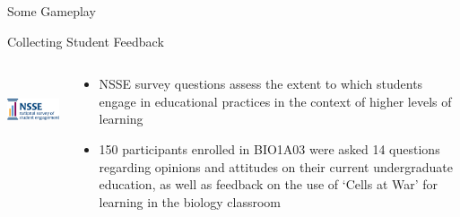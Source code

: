 \documentclass{beamer}
\begin{document}
	\begin{frame}{Some Gameplay}
		\centering
	\end{frame}

	\begin{frame}{Collecting Student Feedback}
		\begin{columns}
			\begin{column}{0.45\textwidth}
				\includegraphics[width=5cm, height=2cm]{nsse.png}
			\end{column}
			\begin{column}{0.5\textwidth}
				\begin{itemize}
					\item NSSE survey questions assess the extent to which students engage in educational practices in the context of higher levels of learning \newline
					\item 150 participants enrolled in BIO1A03 were asked 14 questions regarding opinions and attitudes on their current undergraduate education, as well as feedback on the use of `Cells at War' for learning in the biology classroom
				\end{itemize}
			\end{column}
		\end{columns}			
		
	\end{frame}
\end{document}
